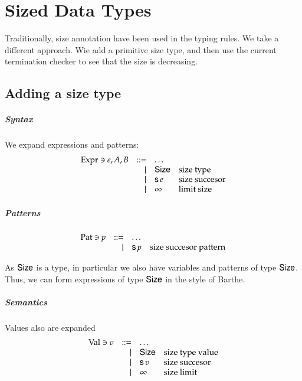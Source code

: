 \chapter{Sized Data Types}
Traditionally, size annotation have been used in the typing rules.
We take a different approach.
Wie add a primitive size type, and then use the current termination checker to see that the size is 
decreasing.

\section{Adding a size type}
\paragraph*{Syntax}
We expand expressions and patterns:
\[
\begin{array}{lrll}
\mathrm{Expr} \ni e,A,B & ::= & \ldots & \\
& \mid & \mathsf{Size} & \mbox{size type} \\
& \mid & \mathsf{s}\, e  & \mbox{size succesor}\\ 
& \mid & \infty & \mbox{limit size}\\
\end{array}
\]

\paragraph*{Patterns}
\[
\begin{array}{lrll}
\mathrm{Pat} \ni p & ::= & \ldots & \\
& \mid & \mathsf{s}\, p & \mbox{size succesor pattern}\\
\end{array}
\]


As $\mathsf{Size}$ is a type, in particular we also have variables and patterns of type $\mathsf{Size}$.
Thus, we can form expressions of type $\mathsf{Size}$ in the style of Barthe.

\paragraph*{Semantics}

Values also are expanded
\[
\begin{array}{lrll}
\mathrm{Val} \ni v & ::= & \ldots & \\
& \mid & \mathsf{Size} & \mbox{size type value}\\
& \mid & \mathsf{s}\, v & \mbox{size succesor}\\
& \mid & \infty & \mbox{size limit}\\
\end{array}
\]

